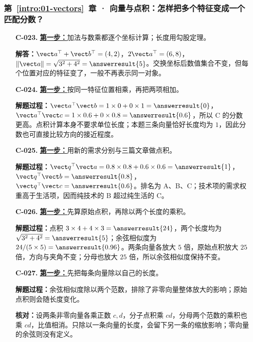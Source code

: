 \subsubsection*{第~\ref*{intro:01-vectors}~章 · 向量与点积：怎样把多个特征变成一个匹配分数？}
\begin{enumerate}[label={},leftmargin=4.8em,itemsep=4pt]
\item[\textbf{C-023.}] \leavevmode{}\label{solution:C-023}\label{solution:vector-coordinate-operations}\hyperref[exercise:vector-coordinate-operations]{\textbf{第一步：}}加法与数乘都逐个坐标计算；长度用勾股定理。\par\nobreak
\textbf{解答：}$\vect a^\top+\vect b^\top=(4,2)$，$2\vect a^\top=(6,8)$，$\|\vect a\|=\sqrt{3^2+4^2}=\answerresult{5}$。交换坐标后数值集合不变，但每个位置对应的特征变了，一般不再表示同一对象。
\item[\textbf{C-024.}] \leavevmode{}\label{solution:C-024}\label{solution:unit-vector-dot-comparison}\hyperref[exercise:unit-vector-dot-comparison]{\textbf{第一步：}}按同一特征位置相乘，再把两项相加。\par\nobreak
\textbf{解题过程：}$\vect a^\top\vect b=1\times0+0\times1=\answerresult{0}$，$\vect a^\top\vect c=1\times0.6+0\times0.8=\answerresult{0.6}$，所以 C 的分数更高。点积计算本身不要求单位长度；本题三条向量恰好长度均为 $1$，因此分数也可直接比较方向的接近程度。
\item[\textbf{C-025.}] \leavevmode{}\label{solution:C-025}\label{solution:article-query-ranking}\hyperref[exercise:article-query-ranking]{\textbf{第一步：}}用新的需求分别与三篇文章做点积。\par\nobreak\textbf{解题过程：}$\vect q^\top\vect a=0.8\times0.8+0.6\times0.6=\answerresult{1}$，$\vect q^\top\vect b=\answerresult{0.8}$，$\vect q^\top\vect c=\answerresult{0.6}$。排名为 A、B、C；技术项的需求权重高于生活项，因而纯技术的 B 超过纯生活的 C。
\item[\textbf{C-026.}] \leavevmode{}\label{solution:C-026}\label{solution:cosine-rescaling}\hyperref[exercise:cosine-rescaling]{\textbf{第一步：}}先算原始点积，再除以两个长度的乘积。\par\nobreak\textbf{解题过程：}点积 $3\times4+4\times3=\answerresult{24}$，两个长度均为 $\sqrt{3^2+4^2}=\answerresult{5}$；余弦相似度为 $24/(5\times5)=\answerresult{0.96}$。两条向量各放大 $5$ 倍，原始点积放大 $25$ 倍，方向与夹角不变；分母也放大 $25$ 倍，所以余弦相似度保持不变。
\item[\textbf{C-027.}] \leavevmode{}\label{solution:C-027}\label{solution:cosine-length-control}\hyperref[exercise:cosine-length-control]{\textbf{第一步：}}先把每条向量除以自己的长度。\par\nobreak\textbf{解题过程：}余弦相似度除以两个范数，排除了非零向量整体放大的影响；原始点积则会随长度变化。\par\textbf{核对：}设两条非零向量各乘正数 $c,d$，分子点积乘 $cd$，分母两个范数的乘积也乘 $cd$，比值相消。只除以一条向量的长度，会留下另一条的缩放影响；零向量的余弦则没有定义。
\end{enumerate}
